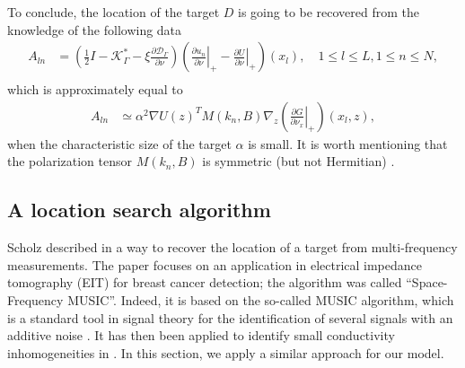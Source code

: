 \documentclass[final]{siamltex}
\numberwithin{equation}{section}
\numberwithin{figure}{section}
\numberwithin{table}{section}
\begin{document}
To conclude, the location of the target $D$ is going to be
recovered from the knowledge of the following data
\begin{equation} \label{defdata}
\begin{alignedat}{1}A_{ln} & =\left(\frac{1}{2}I-\mathcal{K}_{\Gamma}^{*}-\xi\frac{
\partial\mathcal{D}_{\Gamma}}{\partial\nu}\right)\left(\left.\frac{\partial u_{n}}{\partial\nu}\right|_{+}-\left.
\frac{\partial U}{\partial\nu}\right|_{+}\right)(x_{l}), \quad 1\leq l\leq L, 1 \leq n\leq N, \\
\end{alignedat}
\end{equation}
which is approximately equal to
\begin{equation}
\begin{alignedat}{1}A_{ln}
 & \simeq \alpha^{2}\nabla U(z)^T M(k_{n},B) \nabla_{z}\left(\left.\frac{\partial G}{\partial\nu_{x}}\right|_{+}
 \right)(x_{l},z),
\end{alignedat}
\label{eq:SFR-final}
\end{equation}
when the characteristic size of the target $\alpha$  is small. It
is worth mentioning that the  polarization tensor $M(k_{n},B)$ is
symmetric (but not Hermitian) \cite{ammari2007polarization}.


\subsection{A location search algorithm}

\label{sub:algorithm}

Scholz described in \cite{scholz2002towards} a way to recover the
location of a target from multi-frequency measurements. The paper
focuses on an application in electrical impedance tomography (EIT)
for breast cancer detection; the algorithm was called
``Space-Frequency MUSIC''. Indeed, it is based on the so-called
MUSIC algorithm, which is a standard tool in signal theory for the
identification of several signals with an additive noise
\cite{schmidt1986multiple, devaney2004super}. It has then been
applied to identify small conductivity inhomogeneities in
\cite{ammarihanke, ammarinumer, bruhl2003direct}. In this section,
we apply a similar approach for our model.
\end{document}
